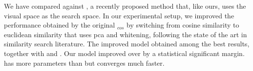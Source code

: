 We have compared against \wordvisual{}, a recently proposed method that, like ours, uses the visual space as the search space.
In our experimental setup, we improved the performance obtained by the original \wordvisual{}$_{cos}$ by switching from cosine similarity to euclidean similarity that uses \gls{pca} and whitening, following the state of the art in similarity search literature.
The improved \wordvisual{} model obtained among the best results, together with \densettv{} and \widedeepttv{}.
Our \widedeepttv{} model improved over \wordvisual{} by a statistical significant margin.
\widedeepttv{} has more parameters than \wordvisual{} but converges much faster.
